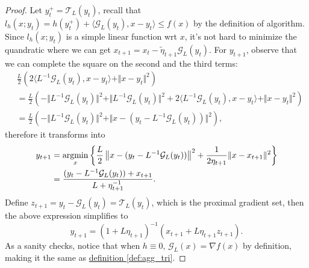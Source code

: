 \documentclass[12pt]{article}
\begin{document}
            \begin{proof}
                Let $y_t^+ = \mathcal T_L(y_t)$, recall that $l_h(x; y_t) = h(y_t^+) + \langle \mathcal G_L(y_t), x -y_t\rangle \le f(x)$ by the definition of algorithm. 
                Since $l_h(x; y_t)$ is a simple linear function wrt $x$, it's not hard to minimize the quandratic where we can get $x_{t + 1} = x_t - \tilde\eta_{t + 1} \mathcal G_L(y_t)$. 
                For $y_{t + 1}$, observe that we can complete the square on the second and the third terms: 
                \begin{align*}
                    & \frac{L}{2}\left(
                        2\langle L^{-1}\mathcal G_L(y_t), x - y_t\rangle + 
                        \Vert x - y_t\Vert^2
                    \right)
                    \\
                    &= 
                    \frac{L}{2}
                    \left(
                        - \Vert L^{-1} \mathcal G_L(y_t)\Vert^2  
                        + \Vert L^{-1} \mathcal G_L(y_t)\Vert^2 
                        + 
                        2\langle L^{-1} \mathcal G_L(y_t), x - y_t\rangle + 
                        \Vert x - y_t\Vert^2
                    \right)
                    \\
                    &= \frac{L}{2}\left(
                        - \Vert L^{-1}\mathcal G_L(y_t)\Vert^2  
                        + \Vert x - (y_t - L^{-1}\mathcal G_L(y_t))
                        \Vert^2
                    \right), 
                \end{align*}
                therefore it transforms into 
                \begin{align*}
                    y_{t + 1} &=\mathop{\rm argmin}\limits_{x} \left\lbrace
                        \frac{L}{2}\left\Vert 
                            x - (y_t - L^{-1}\mathcal G_L(y_t))
                        \right\Vert^2
                        + \frac{1}{2\eta_{t + 1}}\Vert x - x_{t + 1}\Vert^2
                    \right\rbrace
                    \\
                    &=
                    \frac{(y_t - L^{-1}\mathcal G_L(y_t)) + x_{t + 1}}{L + \eta_{t + 1}^{-1}}.
                \end{align*}
                Define $z_{t + 1} = y_t - \mathcal G_L(y_t) = \mathcal T_L(y_t)$, which is the proximal gradient set, then the above expression simplifies to 
                $$
                y_{t + 1} = (1 + L\eta_{t +1})^{-1}(x_{t + 1}+ L\eta_{t + 1}z_{t + 1}). 
                $$
                As a sanity checks, notice that when 
                $h \equiv 0$, 
                $\mathcal G_L(x) = \nabla f(x)$ 
                by definition, making it the same as 
                \hyperref[def:agg_tri]{definition \ref*{def:agg_tri}}. 
            \end{proof}
\end{document}
